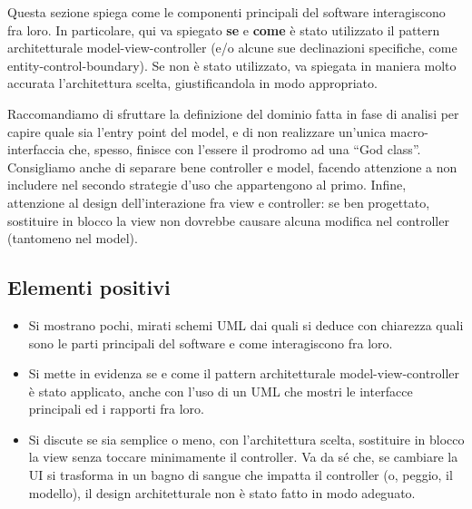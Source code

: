 \documentclass[a4paper,12pt]{report}
\begin{document}
Questa sezione spiega come le componenti principali del software interagiscono fra loro.
%
In particolare, qui va spiegato \textbf{se} e \textbf{come} è stato utilizzato il pattern 
architetturale model-view-controller (e/o alcune sue declinazioni specifiche, come entity-control-boundary).
%
Se non è stato utilizzato, va spiegata in maniera molto accurata l'architettura scelta, giustificandola in modo appropriato.

Raccomandiamo di sfruttare la definizione del dominio fatta in fase di analisi per capire quale sia l'entry point del model, e di non realizzare un'unica macro-interfaccia che, spesso, finisce con l'essere il prodromo ad una ``God class''.
%
Consigliamo anche di separare bene controller e model, facendo attenzione a non includere nel secondo strategie d'uso che appartengono al primo.
%
Infine, attenzione al design dell'interazione fra view e controller: se ben progettato, sostituire 
in blocco la view non dovrebbe causare alcuna modifica nel controller (tantomeno nel model).

\subsection*{Elementi positivi}
\begin{itemize}
 \item Si mostrano pochi, mirati schemi UML dai quali si deduce con chiarezza quali sono le parti principali del software e come interagiscono fra loro.
 \item Si mette in evidenza se e come il pattern architetturale model-view-controller è stato applicato, anche con l'uso di un UML che mostri le interfacce principali ed i rapporti fra loro.
 \item Si discute se sia semplice o meno, con l'architettura scelta, sostituire in blocco la view 
senza toccare minimamente il controller. Va da sé che, se cambiare la UI si trasforma in un bagno di 
sangue che impatta il controller (o, peggio, il modello), il design architetturale non è stato 
fatto in modo adeguato.
\end{itemize}
\end{document}
